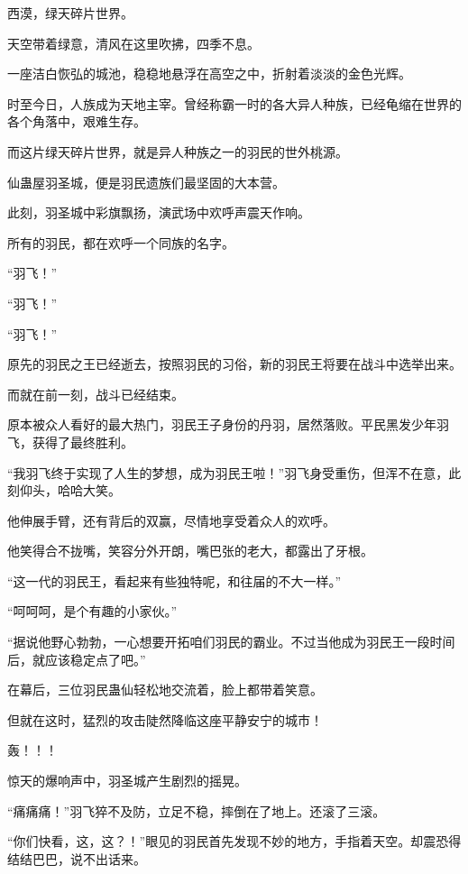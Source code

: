 
\begin{this_body}

西漠，绿天碎片世界。

天空带着绿意，清风在这里吹拂，四季不息。

一座洁白恢弘的城池，稳稳地悬浮在高空之中，折射着淡淡的金色光辉。

时至今日，人族成为天地主宰。曾经称霸一时的各大异人种族，已经龟缩在世界的各个角落中，艰难生存。

而这片绿天碎片世界，就是异人种族之一的羽民的世外桃源。

仙蛊屋羽圣城，便是羽民遗族们最坚固的大本营。

此刻，羽圣城中彩旗飘扬，演武场中欢呼声震天作响。

所有的羽民，都在欢呼一个同族的名字。

“羽飞！”

“羽飞！”

“羽飞！”

原先的羽民之王已经逝去，按照羽民的习俗，新的羽民王将要在战斗中选举出来。

而就在前一刻，战斗已经结束。

原本被众人看好的最大热门，羽民王子身份的丹羽，居然落败。平民黑发少年羽飞，获得了最终胜利。

“我羽飞终于实现了人生的梦想，成为羽民王啦！”羽飞身受重伤，但浑不在意，此刻仰头，哈哈大笑。

他伸展手臂，还有背后的双赢，尽情地享受着众人的欢呼。

他笑得合不拢嘴，笑容分外开朗，嘴巴张的老大，都露出了牙根。

“这一代的羽民王，看起来有些独特呢，和往届的不大一样。”

“呵呵呵，是个有趣的小家伙。”

“据说他野心勃勃，一心想要开拓咱们羽民的霸业。不过当他成为羽民王一段时间后，就应该稳定点了吧。”

在幕后，三位羽民蛊仙轻松地交流着，脸上都带着笑意。

但就在这时，猛烈的攻击陡然降临这座平静安宁的城市！

轰！！！

惊天的爆响声中，羽圣城产生剧烈的摇晃。

“痛痛痛！”羽飞猝不及防，立足不稳，摔倒在了地上。还滚了三滚。

“你们快看，这，这？！”眼见的羽民首先发现不妙的地方，手指着天空。却震恐得结结巴巴，说不出话来。


\end{this_body}
